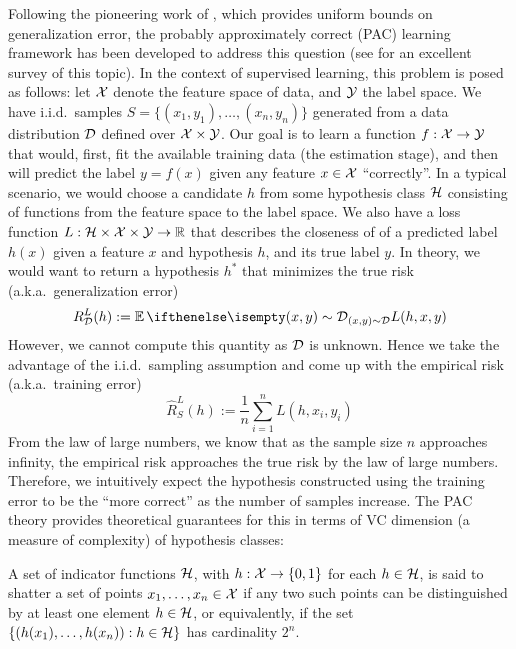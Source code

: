 Following the pioneering work of \citet{vapnik1971uniform}, which provides
uniform bounds on generalization error, the probably approximately correct (PAC)
learning framework has been developed to address this question (see
\citet{shalev2014understanding} for an excellent survey of this topic). In the
context of supervised learning, this problem is posed as follows: let $\mathcal{X}$
denote the feature space of data, and $\mathcal{Y}$ the label space. We have i.i.d.\
samples $S = \{(x_1, y_1), \ldots, (x_n, y_n)\}$ generated from a data
distribution $\mathcal{D}$ defined over $\mathcal{X} \times \mathcal{Y}$. Our goal is to learn a
function $f : \mathcal{X} \to \mathcal{Y}$ that would, first, fit the available training data
(the estimation stage), and then will predict the label $y = f(x)$ given any
feature $x \in \mathcal{X}$ ``correctly''. In a typical scenario, we would choose a
candidate $h$ from some hypothesis class $\mathcal{H}$ consisting of functions from the
feature space to the label space. We also have a loss function $L : \mathcal{H} \times
\mathcal{X} \times \mathcal{Y} \to \mathbb{R}$ that describes the closeness of of a predicted label
$h(x)$ given a feature $x$ and hypothesis $h$, and its true label $y$. In
theory, we would want to return a hypothesis $h^*$ that minimizes the true risk
(a.k.a.\ generalization error)
\begin{equation}
  R_\CD^L(h) := \Ev[(x, y) \sim \CD]{L(h, x, y)}
\end{equation}
However, we cannot compute this quantity as $\mathcal{D}$ is unknown. Hence we take the
advantage of the i.i.d.\ sampling assumption and come up with the empirical risk
(a.k.a.\ training error)
\begin{equation}
  \hat{R}_S^L(h) := \frac{1}{n} \sum_{i = 1}^n L(h, x_i, y_i)
\end{equation}
From the law of large numbers, we know that as the sample size $n$ approaches
infinity, the empirical risk approaches the true risk by the law of large
numbers. Therefore, we intuitively expect the hypothesis constructed using the
training error to be the ``more correct'' as the number of samples increase. The
PAC theory provides theoretical guarantees for this in terms of VC dimension (a
measure of complexity) of hypothesis classes:

\begin{definition}
  A set of indicator functions $\mathcal{H}$, with $h : \mathcal{X} \to \{0, 1\}$ for each $h
  \in \mathcal{H}$, is said to shatter a set of points $x_1, \ldots, x_n \in \mathcal{X}$ if any
  two such points can be distinguished by at least one element $h \in \mathcal{H}$, or
  equivalently, if the set $\{(h(x_1), \ldots, h(x_n)) : h \in \mathcal{H}\}$ has
  cardinality $2^n$.
\end{definition}

